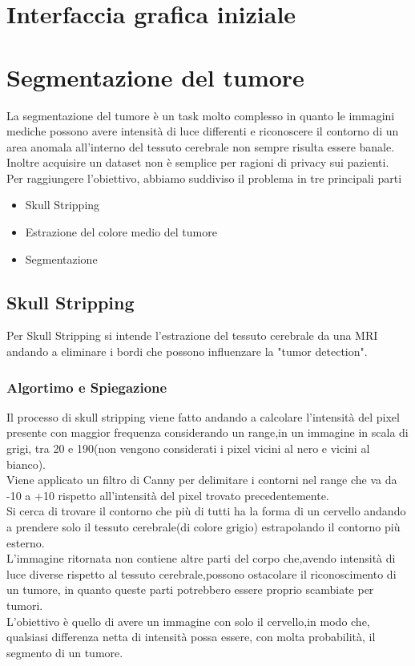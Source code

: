 \documentclass{article}
\begin{document}
\section{Interfaccia grafica iniziale}

\section{Segmentazione del tumore}
La segmentazione del tumore è un task molto complesso in quanto le immagini mediche possono avere intensità di luce differenti e riconoscere il contorno di un area anomala all'interno del tessuto cerebrale non sempre risulta essere banale.\\
Inoltre acquisire un dataset non è semplice per ragioni di privacy sui pazienti.\\
Per raggiungere l'obiettivo, abbiamo suddiviso il problema in tre principali parti
\begin{itemize}
    \item Skull Stripping
    \item Estrazione del colore medio del tumore
    \item Segmentazione
\end{itemize}
\subsection{Skull Stripping}
Per Skull Stripping si intende l'estrazione del tessuto cerebrale da una MRI andando a eliminare i bordi che possono influenzare la "tumor detection".
\subsubsection{Algortimo e Spiegazione}
Il processo di skull stripping viene fatto andando a calcolare l'intensità del pixel presente con maggior frequenza considerando un range,in un immagine in scala di grigi, tra 20 e 190(non vengono considerati i pixel vicini al nero e vicini al bianco).\\
Viene applicato un filtro di Canny per delimitare i contorni nel range che va da -10 a +10 rispetto all'intensità del pixel trovato precedentemente.\\
Si cerca di trovare il contorno che più di tutti ha la forma di un cervello andando a prendere solo il tessuto cerebrale(di colore grigio) estrapolando il contorno più esterno.\\
L'immagine ritornata non contiene altre parti del corpo che,avendo intensità di luce diverse rispetto al tessuto cerebrale,possono ostacolare il riconoscimento di un tumore, in quanto queste parti potrebbero essere proprio scambiate per tumori.\\
L'obiettivo è quello di avere un immagine con solo il cervello,in modo che, qualsiasi differenza netta di intensità possa essere, con molta probabilità, il segmento di un tumore.
\end{document}
